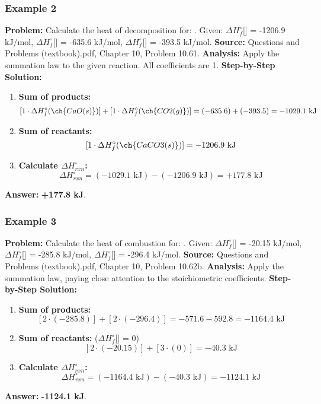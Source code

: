 \documentclass{article}
\begin{document}
\subsubsection{Example 2}
\textbf{Problem:} Calculate the heat of decomposition for: .
Given: $\Delta H_f^\circ$[] = -1206.9 kJ/mol, $\Delta H_f^\circ$[] = -635.6 kJ/mol, $\Delta H_f^\circ$[] = -393.5 kJ/mol.
\textbf{Source:} Questions and Problems (textbook).pdf, Chapter 10, Problem 10.61.
\textbf{Analysis:} Apply the summation law to the given reaction. All coefficients are 1.
\textbf{Step-by-Step Solution:}
\begin{enumerate}
    \item \textbf{Sum of products:}
    \[ [1 \cdot \Delta H_f^\circ(\ch{CaO(s)})] + [1 \cdot \Delta H_f^\circ(\ch{CO2(g)})] = (-635.6) + (-393.5) = -1029.1 \text{ kJ} \]
    \item \textbf{Sum of reactants:}
    \[ [1 \cdot \Delta H_f^\circ(\ch{CaCO3(s)})] = -1206.9 \text{ kJ} \]
    \item \textbf{Calculate $\Delta H_{rxn}^\circ$:}
    \[ \Delta H_{rxn}^\circ = (-1029.1 \text{ kJ}) - (-1206.9 \text{ kJ}) = +177.8 \text{ kJ} \]
\end{enumerate}
\textbf{Answer:} \textbf{+177.8 kJ}.

\subsubsection{Example 3}
\textbf{Problem:} Calculate the heat of combustion for: .
Given: $\Delta H_f^\circ$[] = -20.15 kJ/mol, $\Delta H_f^\circ$[] = -285.8 kJ/mol, $\Delta H_f^\circ$[] = -296.4 kJ/mol.
\textbf{Source:} Questions and Problems (textbook).pdf, Chapter 10, Problem 10.62b.
\textbf{Analysis:} Apply the summation law, paying close attention to the stoichiometric coefficients.
\textbf{Step-by-Step Solution:}
\begin{enumerate}
    \item \textbf{Sum of products:}
    \[ [2 \cdot (-285.8)] + [2 \cdot (-296.4)] = -571.6 - 592.8 = -1164.4 \text{ kJ} \]
    \item \textbf{Sum of reactants:} ($\Delta H_f^\circ$[] = 0)
    \[ [2 \cdot (-20.15)] + [3 \cdot (0)] = -40.3 \text{ kJ} \]
    \item \textbf{Calculate $\Delta H_{rxn}^\circ$:}
    \[ \Delta H_{rxn}^\circ = (-1164.4 \text{ kJ}) - (-40.3 \text{ kJ}) = -1124.1 \text{ kJ} \]
\end{enumerate}
\textbf{Answer:} \textbf{-1124.1 kJ}.
\end{document}
